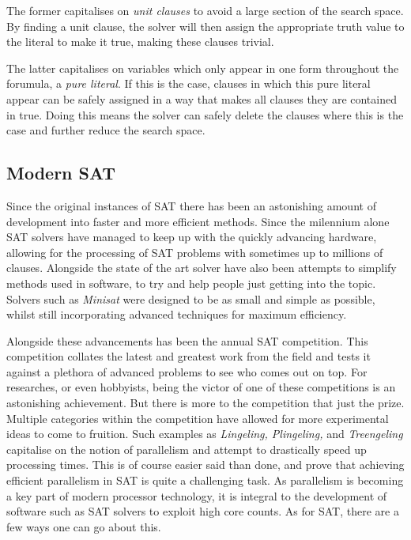 \documentclass{article}
\begin{document}
The former capitalises on \textit{unit clauses} to avoid a large section of the search space. By finding a unit clause, the solver will then assign the appropriate truth value to the literal to make it true, making these clauses trivial.

The latter capitalises on variables which only appear in one form throughout the forumula, a \textit{pure literal}. If this is the case, clauses in which this pure literal appear can be safely assigned in a way that makes all clauses they are contained in true. Doing this means the solver can safely delete the clauses where this is the case and further reduce the search space.

\subsection{Modern SAT}
Since the original instances of SAT there has been an astonishing amount of development into
faster and more efficient methods. Since the milennium alone SAT solvers have managed to keep up
with the quickly advancing hardware, allowing for the processing of SAT problems with sometimes up
to millions of clauses. Alongside the state of the art solver have also been attempts to simplify
methods used in software, to try and help people just getting into the topic. Solvers such as
\textit{Minisat} were designed to be as small and simple as possible, whilst still incorporating
advanced techniques for maximum efficiency. 

Alongside these advancements has been the annual SAT competition. This competition collates the
latest and greatest work from the field and tests it against a plethora of advanced problems to see
who comes out on top. For researches, or even hobbyists, being the victor of one of these
competitions is an astonishing achievement. But there is more to the competition that just the
prize. Multiple categories within the competition have allowed for more experimental ideas to come
to fruition. Such examples as \textit{Lingeling, Plingeling,} and \textit{Treengeling} capitalise on
the notion of parallelism and attempt to drastically speed up processing times. This is of course
easier said than done, and prove that achieving efficient parallelism in SAT is quite a challenging
task. As parallelism is becoming a key part of modern processor technology, it is integral to the
development of software such as SAT solvers to exploit high core counts. As for SAT, there are a few
ways one can go about this.
\end{document}
